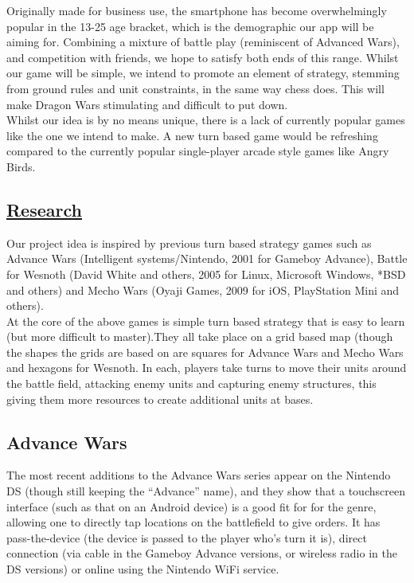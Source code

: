 \documentclass[10pt,a4paper,oneside]{report}
\begin{document}
Originally made for business use, the smartphone has become overwhelmingly popular in the 13-25 age bracket, which is the demographic our app will be aiming for. Combining a mixture of battle play (reminiscent of Advanced Wars), and competition with friends, we hope to satisfy both ends of this range. Whilst our game will be simple, we intend to promote an element of strategy, stemming from ground rules and unit constraints, in the same way chess does. This will make Dragon Wars stimulating and difficult to put down.\\


Whilst our idea is by no means unique, there is a lack of currently popular games like the one we intend to make. A new turn based game would be refreshing compared to the currently popular single-player arcade style games like Angry Birds.
\clearpage
\subsection*{\underline{Research}}
Our project idea is inspired by previous turn based strategy games such as Advance Wars (Intelligent systems/Nintendo, 2001 for Gameboy Advance), Battle for Wesnoth (David White and others, 2005 for Linux, Microsoft Windows, *BSD and others) and Mecho Wars (Oyaji Games, 2009 for iOS, PlayStation Mini and others).\\


At the core of the above games is simple turn based strategy that is easy to learn (but more difficult to master).They all take place on a grid based map (though the shapes the grids are based on are squares for Advance Wars and Mecho Wars and hexagons for Wesnoth. In each, players take turns to move their units around the battle field, attacking enemy units and capturing enemy structures, this giving them more resources to create additional units at bases.\\


\subsection*{Advance Wars}
The most recent additions to the Advance Wars series appear on the Nintendo DS (though still keeping the “Advance” name), and they show that a touchscreen interface (such as that on an Android device) is a good fit for for the genre, allowing one to directly tap locations on the battlefield to give orders. It has pass-the-device (the device is passed to the player who's turn it is), direct connection (via cable in the Gameboy Advance versions, or wireless radio in the DS versions) or online using the Nintendo WiFi service.\\
\end{document}
